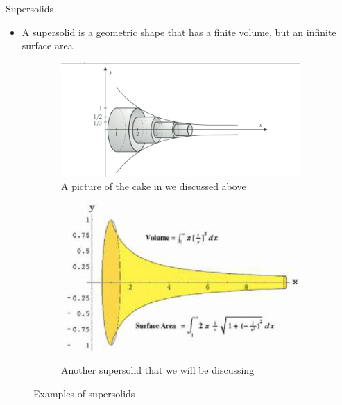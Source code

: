 \documentclass{beamer}
\begin{document}
\begin{frame}{Supersolids}
    \begin{itemize}
        \item A supersolid is a geometric shape that has a finite volume, but an infinite surface area.
    \end{itemize}
    
    \begin{figure}[h]
        \centering
        \begin{subfigure}[b]{0.4\linewidth}
            \includegraphics[width=\linewidth]{cake.png}
            \caption{A picture of the cake in we discussed above}
        \end{subfigure}
        \begin{subfigure}[b]{0.4\linewidth}
            \includegraphics[width=\linewidth]{horn.png}
            \caption{Another supersolid that we will be discussing}
        \end{subfigure}
        \caption{Examples of supersolids}
        \label{fig:coffee}
    \end{figure}

\end{frame}
\end{document}
